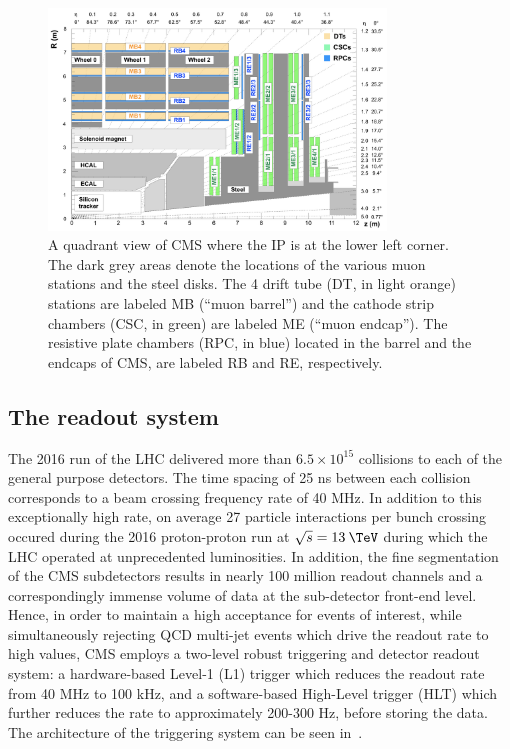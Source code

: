 \begin{figure}
  \centering
  \includegraphics[width=0.8\textwidth]{figs/muonsys}
  \caption{A quadrant view of CMS where the IP is at the lower left corner. The dark grey areas denote the locations of the various muon stations and the steel disks. The 4 drift tube (DT, in light orange) stations are labeled MB (“muon barrel”) and the cathode strip chambers (CSC, in green) are labeled ME (“muon endcap”). The resistive plate chambers (RPC, in blue) located in the barrel and the endcaps of CMS, are labeled RB and RE, respectively.~\cite{Chatrchyan:2013sba}}
\label{fig:muondet}
\end{figure}

\subsection{The readout system}
\label{subsec:readout}

The 2016 run of the LHC delivered more than $6.5 \times 10^{15}$ collisions to each of the general purpose detectors. The time spacing of 25 ns between each collision corresponds to a beam crossing frequency rate of 40 MHz. In addition to this exceptionally high rate, on average 27 particle interactions per bunch crossing occured during the 2016 proton-proton run at $\sqrt{s}=13\:\TeV$ during which the LHC operated at unprecedented luminosities. In addition, the fine segmentation of the CMS subdetectors results in nearly 100 million readout channels and a correspondingly immense volume of data at the sub-detector front-end level. Hence, in order to maintain a high acceptance for events of interest, while simultaneously rejecting QCD multi-jet events which drive the readout rate to high values,  CMS employs a two-level robust triggering and detector readout system: a hardware-based Level-1 (L1) trigger which reduces the readout rate from 40 MHz to 100 kHz, and a software-based High-Level trigger (HLT) which further reduces the rate to approximately 200-300 Hz, before storing the data. The architecture of the triggering system can be seen in~.

